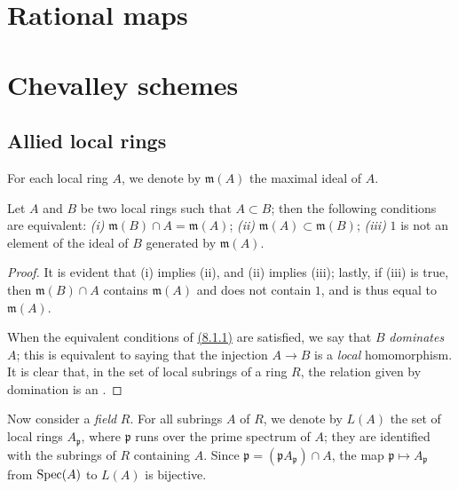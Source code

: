 \section{Rational maps}
\label{section-rational-maps}

\section{Chevalley schemes}
\label{section-chevalley-schemes}

\subsection{Allied local rings}
\label{subsection-allied-local-rings}

For each local ring $A$, we denote by $\mathfrak{m}(A)$ the maximal ideal of
$A$.

\begin{lem}[8.1.1]
\label{lem-1.8.1.1}
Let $A$ and $B$ be two local rings such that $A\subset B$;
then the following conditions are equivalent: {\it (i)}
$\mathfrak{m}(B)\cap A=\mathfrak{m}(A)$; {\it (ii)}
$\mathfrak{m}(A)\subset\mathfrak{m}(B)$; {\it (iii)} $1$ is not an element of
the ideal of $B$ generated by $\mathfrak{m}(A)$.
\end{lem}

\begin{proof}
\label{proof-lem-1.8.1.1}
It is evident that (i) implies (ii), and (ii) implies (iii); lastly, if (iii) is
true, then $\mathfrak{m}(B)\cap A$ contains $\mathfrak{m}(A)$ and does not
contain $1$, and is thus equal to $\mathfrak{m}(A)$.

When the equivalent conditions of \hyperref[lem-1.8.1.1]{(8.1.1)} are satisfied, we say that $B$
{\it dominates} $A$; this is equivalent to saying that the injection $A\to B$
is a {\it local} homomorphism. It is clear that, in the set of local subrings
of a ring $R$, the relation given by domination is an .
\end{proof}

\begin{env}[8.1.2]
\label{env-1.8.1.2}
Now consider a {\it field} $R$. For all subrings $A$ of
$R$, we denote by $L(A)$ the set of local rings $A_\mathfrak{p}$, where
$\mathfrak{p}$ runs over the prime spectrum of $A$; they are identified with the
subrings of $R$ containing $A$. Since
$\mathfrak{p}=(\mathfrak{p}A_\mathfrak{p})\cap A$, the map
$\mathfrak{p}\mapsto A_\mathfrak{p}$ from ${\mathop{\mathrm{Spec}}\nolimits}(A)$ to $L(A)$ is bijective.
\end{env}

